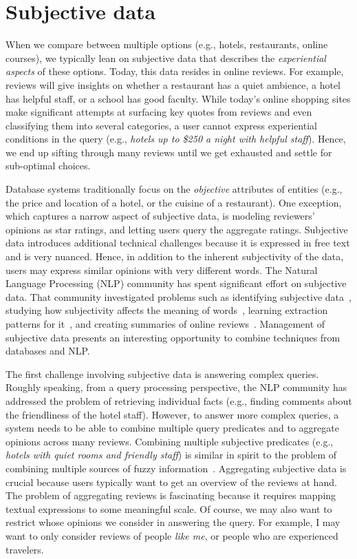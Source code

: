 \documentclass[11pt]{article}
\begin{document}
\section{Subjective data}
When we compare between multiple options (e.g., hotels, restaurants, online courses), we typically lean on subjective data that describes the {\em experiential aspects} of these options. Today, this data resides in online reviews. For example, reviews will give insights on whether a restaurant has a quiet ambience,   
a hotel has helpful staff, or a school has good faculty. While today's online shopping sites make significant attempts at surfacing key quotes from reviews and even classifying them into several categories, a user cannot express experiential conditions in the query  (e.g., {\em hotels up to \$250 a night with helpful staff}). Hence, we end up sifting through many reviews until we get exhausted and settle for sub-optimal choices. 

Database systems traditionally focus on the {\em objective} attributes of entities (e.g., the price and location of a hotel, or the cuisine of a restaurant). One exception, which captures a narrow aspect of subjective data, is modeling reviewers' opinions as star ratings, and letting users query the aggregate ratings. 
Subjective data introduces additional technical challenges because it is expressed in free text and is very nuanced. Hence, in addition to the inherent subjectivity of the data, users may express similar opinions with very different words.  
The Natural Language Processing  (NLP) community has spent significant effort on subjective data. That community investigated problems such as identifying subjective data~\cite{DBLP:journals/coling/WiebeWBBM04}, studying how subjectivity affects the meaning of words~\cite{DBLP:conf/acl/WiebeM06}, learning extraction patterns for it~\cite{DBLP:journals/taffco/WiebeR11}, and creating summaries of online reviews~\cite{liu2012sentiment}.   Management of subjective data presents an interesting opportunity to combine techniques from databases and NLP.

The first challenge involving subjective data is answering complex queries. 
Roughly speaking, from a query processing perspective, the NLP community has addressed the problem of retrieving individual facts (e.g., finding comments about the friendliness of the hotel staff).  However, to answer more complex queries, a system needs to be able to combine multiple query predicates and to aggregate opinions across many reviews. Combining multiple subjective predicates (e.g., {\em hotels with quiet rooms and friendly staff}) is similar in spirit to the problem of combining multiple sources of fuzzy information~\cite{fagin1996combining}.  
Aggregating subjective data is crucial because users typically want to get an overview of the reviews at hand. The problem of aggregating reviews is fascinating because it requires mapping textual expressions to some meaningful scale. Of course, we may also want to restrict whose opinions we consider in answering the query. For example, I may want to only consider reviews of people {\em like me}, or people who are experienced travelers. 
\end{document}
